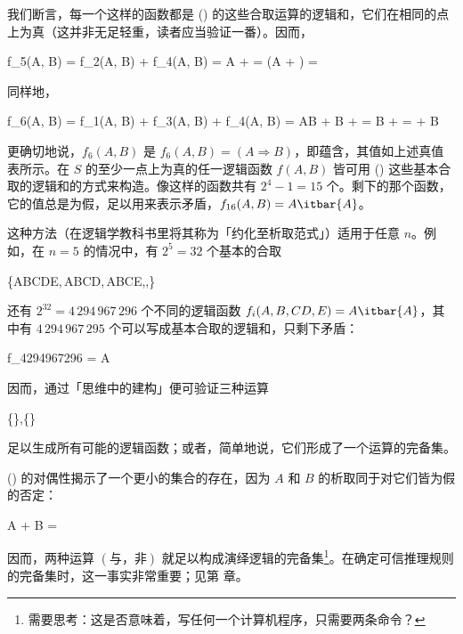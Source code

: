 我们断言，每一个这样的函数都是 (\in[1-17]) 的这些合取运算的逻辑和，它们在相同的点上为真（这并非无足轻重，读者应当验证一番）。因而，

\placeformula
\startformula
\startalign
\NC f_5(A, B) \NC = f_2(A, B) + f_4(A, B)\NR
\NC \NC = A + \NR
\NC \NC = (A + )\NR
\NC \NC = \NR
\stopalign
\stopformula

同样地，

\placeformula
\startformula
\startalign
\NC f_6(A, B) \NC = f_1(A, B) + f_3(A, B) + f_4(A, B)\NR
\NC \NC = AB + B + \NR
\NC \NC = B + \NR
\NC \NC =  + B\NR
\stopalign
\stopformula

更确切地说，$f_6(A, B)$ 是 $f_6(A, B) = (A\Rightarrow B)$，即蕴含，其值如上述真值表所示。在 $S$ 的至少一点上为真的任一逻辑函数 $f(A, B)$ 皆可用 (\in[1-17]) 这些基本合取的逻辑和的方式来构造。像这样的函数共有 $2^4 - 1 = 15$ 个。剩下的那个函数，它的值总是为假，足以用来表示矛盾，$f_{16}(A, B) = A\itbar{A}$。

这种方法（在逻辑学教科书里将其称为「约化至析取范式」）适用于任意 $n$。例如，在 $n = 5$ 的情况中，有 $2^5 = 32$ 个基本的合取

\placeformula
\startformula
\{ABCDE,\,ABCD,\,ABCE,\cdots,\}
\stopformula

还有 $2^{32} = 4\,294\,967\,296$ 个不同的逻辑函数 $f_i(A,B,CD,E) = A\itbar{A}$，其中有 $4\,294\,967\,295$ 个可以写成基本合取的逻辑和，只剩下矛盾：

\placeformula
\startformula
f_{4294967296} = A
\stopformula

因而，通过「思维中的建构」便可验证三种运算

\placeformula
\startformula
\{\},\quad{}\quad \{\}
\stopformula

足以生成所有可能的逻辑函数；或者，简单地说，它们形成了一个运算的完备集。

(\in[1-12]) 的对偶性揭示了一个更小的集合的存在，因为 $A$ 和 $B$ 的析取同于对它们皆为假的否定：

\placeformula
\startformula
A + B = 
\stopformula

因而，两种运算 $(\text{与，非})$ 就足以构成演绎逻辑的完备集\footnote{需要思考：这是否意味着，写任何一个计算机程序，只需要两条命令？}。在确定可信推理规则的完备集时，这一事实非常重要；见第  章。

